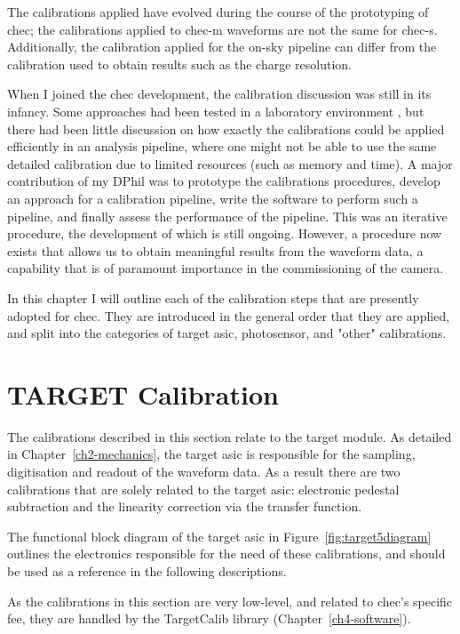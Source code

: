 The calibrations applied have evolved during the course of the prototyping of \gls{chec}; the calibrations applied to \gls{chec-m} waveforms are not the same for \gls{chec-s}. Additionally, the calibration applied for the on-sky pipeline can differ from the calibration used to obtain results such as the charge resolution.

When I joined the \gls{chec} development, the calibration discussion was still in its infancy. Some approaches had been tested in a laboratory environment \cite{Bechtol2012}, but there had been little discussion on how exactly the calibrations could be applied efficiently in an analysis pipeline, where one might not be able to use the same detailed calibration due to limited resources (such as memory and time). A major contribution of my DPhil was to prototype the calibrations procedures, develop an approach for a calibration pipeline, write the software to perform such a pipeline, and finally assess the performance of the pipeline. This was an iterative procedure, the development of which is still ongoing. However, a procedure now exists that allows us to obtain meaningful results from the waveform data, a capability that is of paramount importance in the commissioning of the camera.

In this chapter I will outline each of the calibration steps that are presently adopted for \gls{chec}. They are introduced in the general order that they are applied, and split into the categories of \gls{target} \gls{asic}, photosensor, and "other" calibrations.

\section{TARGET Calibration}

The calibrations described in this section relate to the \gls{target} module. As detailed in Chapter~\ref{ch2-mechanics}, the \gls{target} \gls{asic} is responsible for the sampling, digitisation and readout of the waveform data. As a result there are two calibrations that are solely related to the \gls{target} \gls{asic}: electronic pedestal subtraction and the linearity correction via the transfer function. 

The functional block diagram of the \gls{target} \gls{asic} in Figure~\ref{fig:target5diagram} outlines the electronics responsible for the need of these calibrations, and should be used as a reference in the following descriptions.

As the calibrations in this section are very low-level, and related to \gls{chec}'s specific \gls{fee}, they are handled by the TargetCalib library (Chapter~\ref{ch4-software}).

